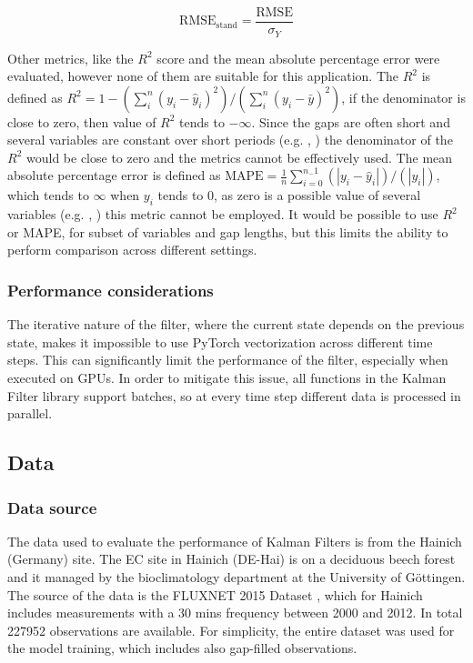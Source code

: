 \documentclass{article}
\let\Oldsubsection\subsection
\renewcommand{\subsection}{\FloatBarrier\Oldsubsection}
\begin{document}
\begin{equation}
    \text{RMSE}_{\text{stand}} = \frac{\text{RMSE}}{\sigma_Y} 
\end{equation}

Other metrics, like the $R^2$ score and the mean absolute percentage error were evaluated, however none of them are suitable for this application. The $R^2$ is defined as $R^2 = 1 - (\sum_{i}^{n} (y_i - \hat{y}_i)^2)/(\sum_{i}^{n} (y_i - \bar{y})^2)$, if the denominator is close to zero, then value of $R^2$ tends to $- \infty$. Since the gaps are often short and several variables are constant over short periods (e.g. , ) the denominator of the $R^2$ would be close to zero and the metrics cannot be effectively used. The mean absolute percentage error is defined as $\text{MAPE} = \frac{1}{n} \sum_{i=0}^{n_-1} (\left| y_i - \hat{y}_i \right|)/(\left| y_i \right|)$, which tends to $\infty$ when $y_i$ tends to 0, as zero is a possible value of several variables (e.g. , ) this metric cannot be employed.
It would be possible to use $R^2$ or MAPE, for subset of variables and gap lengths, but this limits the ability to perform comparison across different settings. 

\subsubsection{Performance considerations} 

The iterative nature of the filter, where the current state depends on the previous state, makes it impossible to use PyTorch vectorization across different time steps. This can significantly limit the performance of the filter, especially when executed on GPUs. In order to  mitigate this issue, all functions in the Kalman Filter library support batches, so at every time step different data is processed in parallel.


\subsection{Data}

\subsubsection{Data source}

The data used to evaluate the performance of Kalman Filters is from the Hainich (Germany) site. The EC site in Hainich (DE-Hai) is on a deciduous beech forest and it managed by the bioclimatology department at the  University of Göttingen. The source of the data is  the FLUXNET 2015 Dataset \cite{pastorello_fluxnet2015_2020}, which for Hainich includes measurements with a 30 mins frequency between 2000 and 2012. In total 227952 observations are available. For simplicity, the entire dataset was used for the model training, which includes also gap-filled observations.
\end{document}
